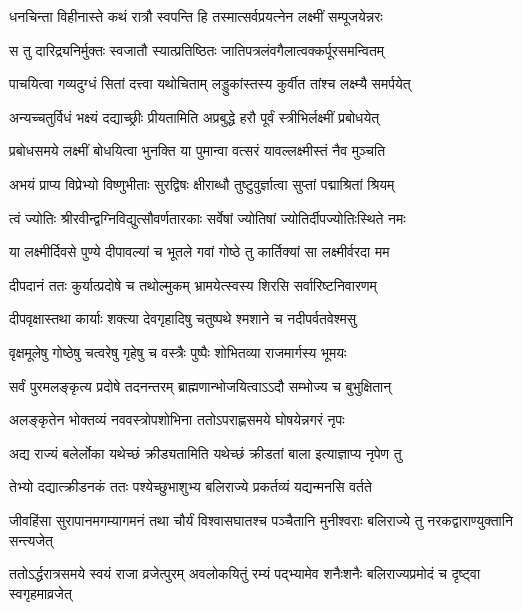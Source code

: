 \twolineshloka
{धनचिन्ता विहीनास्ते कथं रात्रौ स्वपन्ति हि}
{तस्मात्सर्वप्रयत्नेन लक्ष्मीं सम्पूजयेन्नरः} %

\twolineshloka
{स तु दारिद्र्यनिर्मुक्तः स्वजातौ स्यात्प्रतिष्ठितः}
{जातिपत्रलंवगैलात्वक्कर्पूरसमन्वितम्} %

\twolineshloka
{पाचयित्वा गव्यदुग्धं सितां दत्त्वा यथोचिताम्}
{लड्डुकांस्तस्य कुर्वीत तांश्च लक्ष्म्यै समर्पयेत्} %

\twolineshloka
{अन्यच्चतुर्विधं भक्ष्यं दद्याच्छ्रीः प्रीयतामिति}
{अप्रबुद्धे हरौ पूर्वं स्त्रीभिर्लक्ष्मीं प्रबोधयेत्} %

\twolineshloka
{प्रबोधसमये लक्ष्मीं बोधयित्वा भुनक्ति या}
{पुमान्वा वत्सरं यावल्लक्ष्मीस्तं नैव मुञ्चति} %

\twolineshloka
{अभयं प्राप्य विप्रेभ्यो विष्णुभीताः सुरद्विषः}
{क्षीराब्धौ तुष्टुवुर्ज्ञात्वा सुप्तां पद्माश्रितां श्रियम्} %

\twolineshloka
{त्वं ज्योतिः श्रीरवीन्द्वग्निविद्युत्सौवर्णतारकाः}
{सर्वेषां ज्योतिषां ज्योतिर्दीपज्योतिःस्थिते नमः} %

\twolineshloka
{या लक्ष्मीर्दिवसे पुण्ये दीपावल्यां च भूतले}
{गवां गोष्ठे तु कार्तिक्यां सा लक्ष्मीर्वरदा मम} %

\twolineshloka
{दीपदानं ततः कुर्यात्प्रदोषे च तथोल्मुकम्}
{भ्रामयेत्स्वस्य शिरसि सर्वारिष्टनिवारणम्} %

\twolineshloka
{दीपवृक्षास्तथा कार्याः शक्त्या देवगृहादिषु}
{चतुष्पथे श्मशाने च नदीपर्वतवेश्मसु} %

\twolineshloka
{वृक्षमूलेषु गोष्ठेषु चत्वरेषु गृहेषु च}
{वस्त्रैः पुष्पैः शोभितव्या राजमार्गस्य भूमयः} %

\twolineshloka
{सर्वं पुरमलङ्कृत्य प्रदोषे तदनन्तरम्}
{ब्राह्मणान्भोजयित्वाऽऽदौ सम्भोज्य च बुभुक्षितान्} %

\twolineshloka
{अलङ्कृतेन भोक्तव्यं नववस्त्रोपशोभिना}
{ततोऽपराह्णसमये घोषयेन्नगरं नृपः} %

\twolineshloka
{अद्य राज्यं बलेर्लोका यथेच्छं क्रीड्यतामिति}
{यथेच्छं क्रीडतां बाला इत्याज्ञाप्य नृपेण तु} %

\twolineshloka
{तेभ्यो दद्यात्क्रीडनकं ततः पश्येच्छुभाशुभ्य}
{बलिराज्ये प्रकर्तव्यं यद्यन्मनसि वर्तते} %

\threelineshloka
{जीवहिंसा सुरापानमगम्यागमनं तथा}
{चौर्यं विश्वासघातश्च पञ्चैतानि मुनीश्वराः}
{बलिराज्ये तु नरकद्वाराण्युक्तानि सन्त्यजेत्} %

\threelineshloka
{ततोऽर्द्धरात्रसमये स्वयं राजा व्रजेत्पुरम्}
{अवलोकयितुं रम्यं पद्भ्यामेव शनैःशनैः}
{बलिराज्यप्रमोदं च दृष्ट्वा स्वगृहमाव्रजेत्} %

